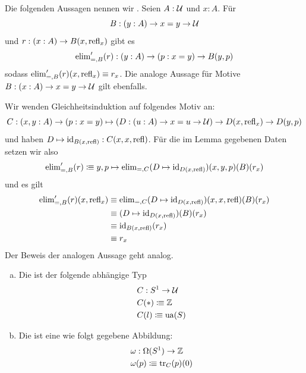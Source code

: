 \begin{lemma}
  Die folgenden Aussagen nennen wir .
  Seien $A:\mathcal{U}$ und $x:A$.
  Für \[B:(y:A)\to x=y\to \mathcal{U}\] und $r:(x:A)\to B(x,\mathrm{refl}_x)$ gibt es
  \[
    \mathrm{elim}_{=,B}^\prime(r):(y:A)\to (p:x=y)\to B(y,p)
  \]
  sodass $\mathrm{elim}_{=,B}^\prime(r)(x,\mathrm{refl}_x)\equiv r_x$.
  Die analoge Aussage für Motive $B:(x:A)\to x=y\to \mathcal{U}$ gilt ebenfalls.
\end{lemma}

\begin{beweis}
  Wir wenden Gleichheitsinduktion auf folgendes Motiv an:
  \[
  C:(x,y : A)\to (p:x=y)\mapsto (D:(u : A)\to x = u\to \mathcal{U}) \to D(x,\mathrm{refl}_x)\to D(y,p)
  \]
  und haben $D\mapsto \mathrm{id}_{B(x,\mathrm{refl})}:C(x,x,\mathrm{refl})$. Für die im Lemma gegebenen Daten setzen wir also
  \[
  \mathrm{elim}_{=,B}^\prime(r)\vcentcolon\mspace{-1.2mu}\equiv y,p\mapsto \mathrm{elim}_{=,C}(D\mapsto \mathrm{id}_{D(x,\mathrm{refl})})(x,y,p)(B)(r_x)
  \]
  und es gilt
  \begin{align*}
    \mathrm{elim}_{=,B}^\prime(r)(x,\mathrm{refl}_x)&\equiv\mathrm{elim}_{=,C}(D\mapsto \mathrm{id}_{D(x,\mathrm{refl})})(x,x,\mathrm{refl})(B)(r_x)\\
    &\equiv(D\mapsto \mathrm{id}_{D(x,\mathrm{refl})})(B)(r_x) \\
    &\equiv\mathrm{id}_{B(x,\mathrm{refl})}(r_x) \\
    &\equiv r_x \\
  \end{align*}
  Der Beweis der analogen Aussage geht analog.
\end{beweis}

\begin{definition}
  \begin{enumerate}[(a)]
  \item Die  ist der folgende abhängige Typ
    \begin{align*}
      &C:S^1\to \mathcal{U} \\
      &C(\ast)\vcentcolon\mspace{-1.2mu}\equiv \mathbb{Z} \\
      &C(l)\vcentcolon\mspace{-1.2mu}\equiv \mathrm{ua}(S)
    \end{align*}
  \item Die  ist eine wie folgt gegebene Abbildung:
  \begin{align*}
    &\omega:\Omega(S^1)\to \mathbb{Z} \\
    &\omega(p)\vcentcolon\mspace{-1.2mu}\equiv \mathrm{tr}_C(p)(0)
  \end{align*}
  \end{enumerate}
\end{definition}

